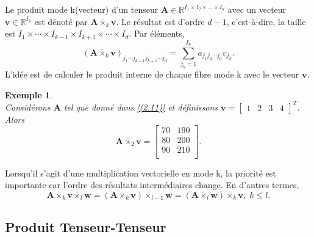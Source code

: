 \documentclass[11pt,a4paper,oneside]{book}
\newtheorem{ex}{Exemple}[chapter]}
\def\R{\mathbb R}
\def\RItd{\mathbb{R}^{I_1 \times I_2 \times \ldots \times I_d}}
\newcommand{\mbf}[1]{\mathbf{#1}}
\begin{document}
Le produit mode k(vecteur) d'un tenseur $ \mbf{A}\in\RItd $ avec un vecteur $ \mbf{v}\in\R^{I_{k}} $ est dénoté par $ \mbf{A}\overline{\times }_{k}\mbf{v} $. Le résultat est d'ordre $ d-1 $, c'est-à-dire, la taille est $ I_{1}\times\cdots\times I_{k-1}\times I_{k+1}\times\cdots\times I_{d} $. Par éléments, 
\begin{equation}
(\mbf{A}\overline{\times}_{k}\mbf{v})_{j_{1}\cdots j_{k-1}j_{k+1}\cdots j_{d}}=\sum_{j_{k}=1}^{I_{k}}a_{j_{1}j_{2}\cdots j_{d}}v_{j_{k}}.
\end{equation}
L'idée est de calculer le produit interne de chaque fibre mode k avec le vecteur $ \mbf{v} $.
\begin{ex}
\emph{\\}
 Considérons $ \mbf{A} $ tel que donné dans \eqref{(2.11)} et définissons $ \mbf{v}=\begin{bmatrix}
1&2&3&4
\end{bmatrix}^{T} $. Alors
$$\mbf{A}\overline{\times }_{2}\mbf{v}=\begin{bmatrix}
70&190\\
80&200\\
90&210\\
\end{bmatrix}. $$
\end{ex}

Lorsqu'il s'agit d'une multiplication vectorielle en mode k, la priorité est importante car l'ordre des résultats intermédiaires change. En d'autres termes,
\begin{equation}
\mbf{A}\overline{\times}_{k}\mbf{v}\overline{\times}_{l}\mbf{w}=(\mbf{A}\overline{\times}_{k}\mbf{v})\overline{\times}_{l-1}\mbf{w}=(\mbf{A}\overline{\times}_{l}\mbf{w})\overline{\times}_{k}\mbf{v},\; k\leq l.
\end{equation}

\subsection{Produit Tenseur-Tenseur}
\end{document}

